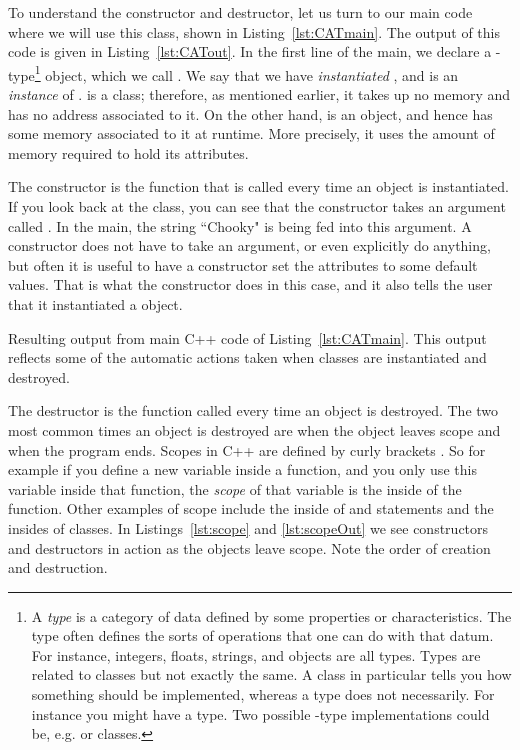 To understand the constructor and destructor, let us turn to our main
code where we will use this class, shown
in Listing~\ref{lst:CATmain}. The output of this code is
given in Listing~\ref{lst:CATout}. In the first line of
the main, we declare a
-type\footnote{A {\it type} is a category of data
defined by some properties or characteristics. The type often defines the sorts
of operations that one can do with that datum. For instance, integers, floats,
strings, and objects are all types. Types are related to classes but not exactly
the same. A class in particular tells you how something should be implemented,
whereas a type does not necessarily. For instance you might have a 
type. Two possible -type implementations could be, e.g.
 or  classes.} object, which we call . 
We say that we have
{\it instantiated} , and  is an {\it instance}
of .  is a class; therefore, as mentioned
earlier, it takes up no memory and has no address associated to it.
On the other hand,  is an object, and hence has some
memory associated to it at runtime. More precisely, it uses the
amount of memory required to hold its attributes.

The constructor is the function that is called every time an object is
instantiated. If you look back at the  class, you can see that
the constructor takes an argument called . In the main,
the string ``Chooky" is being fed into this argument. A constructor does
not have to take an argument, or even explicitly do anything, but often
it is useful to have a constructor set the attributes to some default values.
That is what the constructor does in this case, and it also tells the
user that it instantiated a  object.

\begin{code*}
\caption{Resulting output from main C++ code of Listing~\ref{lst:CATmain}.
This output reflects some of the automatic actions taken when 
classes are instantiated and destroyed.}
\label{lst:CATout}
\end{code*}

The destructor is the function called every time an object is destroyed.
The two most common times an object is destroyed are when the object
leaves scope and when the program ends. Scopes in C++ are defined by
curly brackets \ff{\{\}}. So for example if you define a new variable
inside a function, and you only use this variable inside that function,
the {\it scope} of that variable is the inside of the function. 
Other examples of scope include
the inside of  and  statements and the
insides of classes. In Listings~\ref{lst:scope} and \ref{lst:scopeOut}
we see constructors and destructors in action as the objects
leave scope. Note the order of creation 
and destruction.

